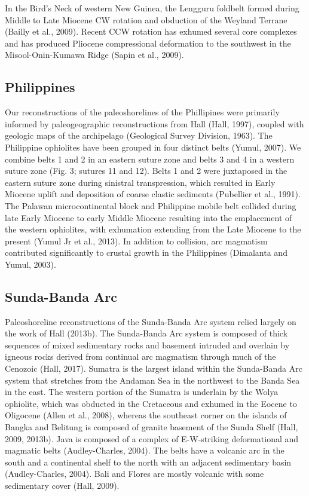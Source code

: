 \documentclass[11pt,letterpaper]{article}
\begin{document}
In the Bird’s Neck of western New Guinea, the Lengguru foldbelt formed during Middle to Late Miocene CW rotation and obduction of the Weyland Terrane (Bailly et al., 2009). Recent CCW rotation has exhumed several core complexes and has produced Pliocene compressional deformation to the southwest in the Misool-Onin-Kumawa Ridge (Sapin et al., 2009).

\subsection*{Philippines}

Our reconstructions of the paleoshorelines of the Phillipines were primarily informed by paleogeographic reconstructions from Hall (Hall, 1997), coupled with geologic maps of the archipelago (Geological Survey Division, 1963). The Philippine ophiolites have been grouped in four distinct belts (Yumul, 2007). We combine belts 1 and 2 in an eastern suture zone and belts 3 and 4 in a western suture zone (Fig. 3; sutures 11 and 12). Belts 1 and 2 were juxtaposed in the eastern suture zone during sinistral transpression, which resulted in Early Miocene uplift and deposition of coarse clastic sediments (Pubellier et al., 1991). The Palawan microcontinental block and Philippine mobile belt collided during late Early Miocene to early Middle Miocene resulting into the emplacement of the western ophiolites, with exhumation extending from the Late Miocene to the present (Yumul Jr et al., 2013). In addition to collision, arc magmatism contributed significantly to crustal growth in the Philippines (Dimalanta and Yumul, 2003).

\subsection*{Sunda-Banda Arc}

Paleoshoreline reconstructions of the Sunda-Banda Arc system relied largely on the work of Hall (2013b). The Sunda-Banda Arc system is composed of thick sequences of mixed sedimentary rocks and basement intruded and overlain by igneous rocks derived from continual arc magmatism through much of the Cenozoic (Hall, 2017). Sumatra is the largest island within the Sunda-Banda Arc system that stretches from the Andaman Sea in the northwest to the Banda Sea in the east. The western portion of the Sumatra is underlain by the Wolya ophiolite, which was obducted in the Cretaceous and exhumed in the Eocene to Oligocene (Allen et al., 2008), whereas the southeast corner on the islands of Bangka and Belitung is composed of granite basement of the Sunda Shelf (Hall, 2009, 2013b). Java is composed of a complex of E-W-striking deformational and magmatic belts (Audley-Charles, 2004). The belts have a volcanic arc in the south and a continental shelf to the north with an adjacent sedimentary basin (Audley-Charles, 2004). Bali and Flores are mostly volcanic with some sedimentary cover (Hall, 2009).
\end{document}
